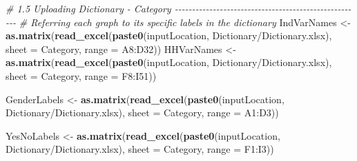 \documentclass[
]{article}
\newenvironment{Shaded}{\begin{snugshade}}{\end{snugshade}}
\newcommand{\AttributeTok}[1]{\textcolor[rgb]{0.13,0.29,0.53}{#1}}
\newcommand{\CommentTok}[1]{\textcolor[rgb]{0.56,0.35,0.01}{\textit{#1}}}
\newcommand{\FunctionTok}[1]{\textcolor[rgb]{0.13,0.29,0.53}{\textbf{#1}}}
\newcommand{\NormalTok}[1]{#1}
\newcommand{\OtherTok}[1]{\textcolor[rgb]{0.56,0.35,0.01}{#1}}
\newcommand{\StringTok}[1]{\textcolor[rgb]{0.31,0.60,0.02}{#1}}
\begin{document}
\begin{Shaded}
\begin{Highlighting}[]
\CommentTok{\# 1.5 Uploading Dictionary {-} Category {-}{-}{-}{-}{-}{-}{-}{-}{-}{-}{-}{-}{-}{-}{-}{-}{-}{-}{-}{-}{-}{-}{-}{-}{-}{-}{-}{-}{-}{-}{-}{-}{-}{-}{-}{-}{-}{-}{-}{-}{-}{-}{-}{-}{-}{-}{-}{-}{-}{-}{-}{-}{-}{-}}
\CommentTok{\# Referring each graph to its specific labels in the dictionary}
\NormalTok{IndVarNames }\OtherTok{\textless{}{-}} \FunctionTok{as.matrix}\NormalTok{(}\FunctionTok{read\_excel}\NormalTok{(}\FunctionTok{paste0}\NormalTok{(inputLocation, }\StringTok{\textquotesingle{}Dictionary/Dictionary.xlsx\textquotesingle{}}\NormalTok{), }\AttributeTok{sheet =} \StringTok{\textquotesingle{}Category\textquotesingle{}}\NormalTok{, }\AttributeTok{range =} \StringTok{\textquotesingle{}A8:D32\textquotesingle{}}\NormalTok{)) }
\NormalTok{HHVarNames }\OtherTok{\textless{}{-}} \FunctionTok{as.matrix}\NormalTok{(}\FunctionTok{read\_excel}\NormalTok{(}\FunctionTok{paste0}\NormalTok{(inputLocation, }\StringTok{\textquotesingle{}Dictionary/Dictionary.xlsx\textquotesingle{}}\NormalTok{), }\AttributeTok{sheet =} \StringTok{\textquotesingle{}Category\textquotesingle{}}\NormalTok{, }\AttributeTok{range =} \StringTok{\textquotesingle{}F8:I51\textquotesingle{}}\NormalTok{)) }

\NormalTok{GenderLabels }\OtherTok{\textless{}{-}} \FunctionTok{as.matrix}\NormalTok{(}\FunctionTok{read\_excel}\NormalTok{(}\FunctionTok{paste0}\NormalTok{(inputLocation, }\StringTok{\textquotesingle{}Dictionary/Dictionary.xlsx\textquotesingle{}}\NormalTok{), }\AttributeTok{sheet =} \StringTok{\textquotesingle{}Category\textquotesingle{}}\NormalTok{, }\AttributeTok{range =} \StringTok{\textquotesingle{}A1:D3\textquotesingle{}}\NormalTok{)) }

\NormalTok{YesNoLabels }\OtherTok{\textless{}{-}} \FunctionTok{as.matrix}\NormalTok{(}\FunctionTok{read\_excel}\NormalTok{(}\FunctionTok{paste0}\NormalTok{(inputLocation, }\StringTok{\textquotesingle{}Dictionary/Dictionary.xlsx\textquotesingle{}}\NormalTok{), }\AttributeTok{sheet =} \StringTok{\textquotesingle{}Category\textquotesingle{}}\NormalTok{, }\AttributeTok{range =} \StringTok{\textquotesingle{}F1:I3\textquotesingle{}}\NormalTok{)) }
\end{Highlighting}
\end{Shaded}
\end{document}
